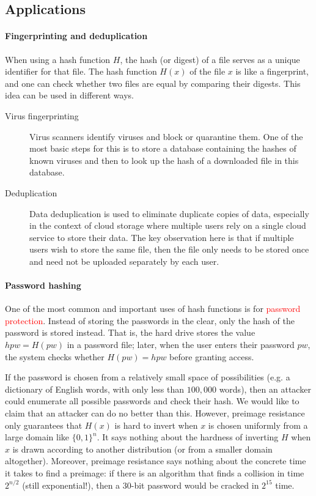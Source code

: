 \documentclass[a4paper, 11pt, openany]{book}
\numberwithin{equation}{section}
\theoremstyle{plain}
\theoremstyle{definition}
\newcommand{\Important}[1]{\textcolor{red}{#1}}
\begin{document}
\subsection{Applications}

\paragraph{Fingerprinting and deduplication}
When using a hash function $H$, the hash (or digest) of a file serves as a unique identifier for that file. The hash function $H(x)$ of the file $x$ is like a fingerprint, and one can check whether two files are equal by comparing their digests. This idea can be used in different ways.

\begin{description}
    \item [Virus fingerprinting] Virus scanners identify viruses and block or quarantine them. One of the most basic steps for this is to store a database containing the hashes of known viruses and then to look up the hash of a downloaded file in this database.
    
    \item [Deduplication] Data deduplication is used to eliminate duplicate copies of data, especially in the context of cloud storage where multiple users rely on a single cloud service to store their data. The key observation here is that if multiple users wish to store the same file, then the file only needs to be stored once and need not be uploaded separately by each user.
\end{description}



\paragraph{Password hashing}

One of the most common and important uses of hash functions is for \Important{password protection}. Instead of storing the passwords in the clear, only the hash of the password is stored instead. That is, the hard drive stores the value $hpw = H(pw)$ in a password file; later, when the user enters their password $pw$, the system checks whether $H(pw) = hpw$ before granting access.

If the password is chosen from a relatively small space of possibilities (e.g. a dictionary of English words, with only less than $100,000$ words), then an attacker could enumerate all possible passwords and check their hash. We would like to claim that an attacker can do no better than this. However, preimage resistance only guarantees that $H(x)$ is hard to invert when $x$ is chosen uniformly from a large domain like $\{0,1\}^n$. It says nothing about the hardness of inverting $H$ when $x$ is drawn according to another distribution (or from a smaller domain altogether). Moreover, preimage resistance says nothing about the concrete time it takes to find a preimage: if there is an algorithm that finds a collision in time $2^{n/2}$ (still exponential!), then a 30-bit password would be cracked in $2^{15}$ time.
\end{document}
